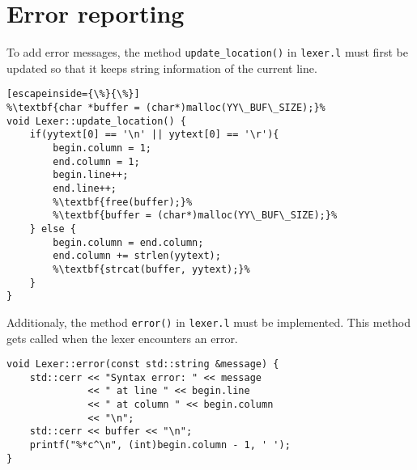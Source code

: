 \documentclass{report}
\begin{document}
	\section{Error reporting}
	To add error messages, the method \texttt{update\_location()} in \texttt{lexer.l} must first be updated so that it keeps string information of the current line.
		\begin{lstlisting}[escapeinside={\%}{\%}]
%\textbf{char *buffer = (char*)malloc(YY\_BUF\_SIZE);}%
void Lexer::update_location() {
	if(yytext[0] == '\n' || yytext[0] == '\r'){
		begin.column = 1; 
		end.column = 1;
		begin.line++; 
		end.line++;
		%\textbf{free(buffer);}%
		%\textbf{buffer = (char*)malloc(YY\_BUF\_SIZE);}%
	} else {
		begin.column = end.column;
		end.column += strlen(yytext);
		%\textbf{strcat(buffer, yytext);}%
	}
}	
	\end{lstlisting}
	Additionaly, the method \texttt{error()} in \texttt{lexer.l} must be implemented. This method gets called when the lexer encounters an error.
	\begin{lstlisting}
void Lexer::error(const std::string &message) {
	std::cerr << "Syntax error: " << message 
	          << " at line " << begin.line
	          << " at column " << begin.column 
	          << "\n";
	std::cerr << buffer << "\n";
	printf("%*c^\n", (int)begin.column - 1, ' ');
}
	\end{lstlisting}
\end{document}
